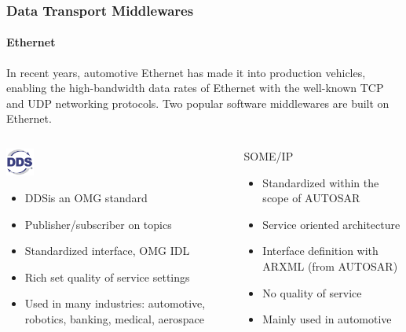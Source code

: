 \begin{frame}
\frametitle{Data Transport Middlewares}
\framesubtitle{Ethernet}
In recent years, automotive Ethernet has made it into production vehicles,
enabling the high-bandwidth data rates of Ethernet with the well-known
TCP and UDP networking protocols. Two popular software middlewares are built
on Ethernet.
\begin{columns}[T]
    \begin{column}{0.5\textwidth}
        \includegraphics[width=0.125\textwidth]{images/dds.jpg}
        \begin{itemize}
            \item DDS\footnotemark[1] is an OMG standard
            \item Publisher/subscriber on topics
            \item Standardized interface, OMG IDL\footnotemark[2]
            \item Rich set quality of service settings
            \item Used in many industries: automotive, robotics, banking,
                medical, aerospace
        \end{itemize}
    \end{column}
    \begin{column}{0.5\textwidth}
        SOME/IP\footnotemark[3]\\
        \begin{itemize}
            \item Standardized within the scope of AUTOSAR \cite{AutosarSomeIp}
            \item Service oriented architecture
            \item Interface definition with ARXML (from AUTOSAR)
            \item No quality of service
            \item Mainly used in automotive
        \end{itemize}
    \end{column}
\end{columns}
\end{frame}

